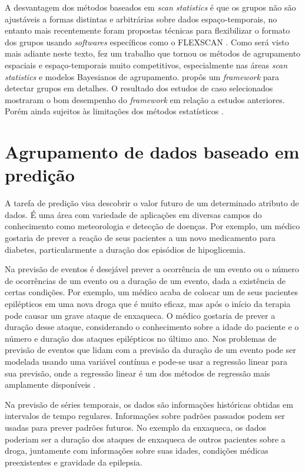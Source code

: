 A desvantagem dos métodos baseados em \emph{scan statistics} é que os grupos não são ajustáveis a formas distintas e arbitrárias sobre dados espaço-temporais, no entanto mais recentemente foram propostas técnicas para flexibilizar o formato dos grupos usando \emph{softwares} específicos como o FLEXSCAN \cite{Tango2005}. Como será visto mais adiante neste texto, \cite{DanielNeill2006} fez um trabalho que tornou os métodos de agrupamento espaciais e espaço-temporais muito competitivos, especialmente nas áreas \emph{scan statistics} e modelos Bayesianos de agrupamento.  propôs um \emph{framework} para detectar grupos em detalhes. O resultado dos estudos de caso selecionados mostraram o bom desempenho do \emph{framework} em relação a estudos anteriores. Porém ainda sujeitos às limitações dos métodos estatísticos \cite{Zhicheng:2019}.   

\section{Agrupamento de dados baseado em predição}

A tarefa de predição visa descobrir o valor futuro de um determinado atributo de dados. É uma área com variedade de aplicações em diversas campos do conhecimento como meteorologia e detecção de doenças. Por exemplo, um médico gostaria de prever a reação de seus pacientes a um novo medicamento para diabetes, particularmente a duração dos episódios de hipoglicemia.

Na previsão de eventos é desejável prever a ocorrência de um evento ou o número de ocorrências de um evento ou a duração de um evento, dada a existência de certas condições. Por exemplo, um médico acaba de colocar um de seus pacientes epilépticos em uma nova droga que é muito eficaz, mas após o início da terapia pode causar um grave ataque de enxaqueca. O médico gostaria de prever a duração desse ataque, considerando o conhecimento sobre a idade do paciente e o número e duração dos ataques epilépticos no último ano. Nos problemas de previsão de eventos que lidam com a previsão da duração de um evento pode ser modelada usando uma variável contínua e pode-se usar a regressão linear para sua previsão, onde a regressão linear é um dos métodos de regressão mais amplamente disponíveis \cite{Mitsa:2010}.

Na previsão de séries temporais, os dados são informações históricas obtidas em intervalos de tempo regulares. Informações sobre padrões passados podem ser usadas para prever padrões futuros. No exemplo da enxaqueca, os dados poderiam ser a duração dos ataques de enxaqueca de outros pacientes sobre a droga, juntamente com informações sobre suas idades, condições médicas preexistentes e gravidade da epilepsia.

